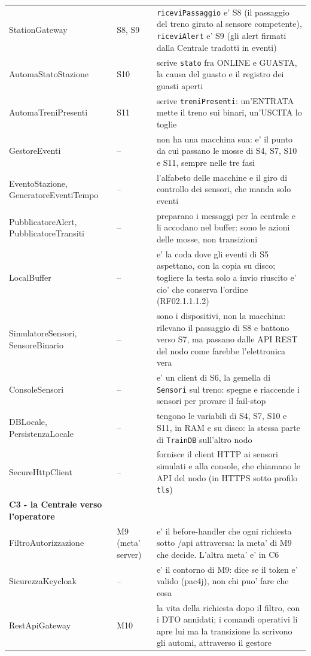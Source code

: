 \documentclass[11pt]{article}
\begin{document}
{\begin{longtable}{L{0.30\textwidth}L{0.13\textwidth}L{0.44\textwidth}}
StationGateway & S8, S9 & \texttt{riceviPassaggio} e' S8 (il passaggio del treno girato al sensore competente), \texttt{riceviAlert} e' S9 (gli alert firmati dalla Centrale tradotti in eventi)\\
AutomaStatoStazione & S10 & scrive \texttt{stato} fra ONLINE e GUASTA, la causa del guasto e il registro dei guasti aperti\\
AutomaTreniPresenti & S11 & scrive \texttt{treniPresenti}: un'ENTRATA mette il treno sui binari, un'USCITA lo toglie\\
GestoreEventi & -- & non ha una macchina sua: e' il punto da cui passano le mosse di S4, S7, S10 e S11, sempre nelle tre fasi\\
EventoStazione, GeneratoreEventiTempo & -- & l'alfabeto delle macchine e il giro di controllo dei sensori, che manda solo eventi\\
PubblicatoreAlert, PubblicatoreTransiti & -- & preparano i messaggi per la centrale e li accodano nel buffer: sono le azioni delle mosse, non transizioni\\
LocalBuffer & -- & e' la coda dove gli eventi di S5 aspettano, con la copia su disco; togliere la testa solo a invio riuscito e' cio' che conserva l'ordine (RF02.1.1.1.2)\\
SimulatoreSensori, SensoreBinario & -- & sono i dispositivi, non la macchina: rilevano il passaggio di S8 e battono verso S7, ma passano dalle API REST del nodo come farebbe l'elettronica vera\\
ConsoleSensori & -- & e' un client di S6, la gemella di \texttt{Sensori} sul treno: spegne e riaccende i sensori per provare il fail-stop\\
DBLocale, PersistenzaLocale & -- & tengono le variabili di S4, S7, S10 e S11, in RAM e su disco: la stessa parte di \texttt{TrainDB} sull'altro nodo\\
SecureHttpClient & -- & fornisce il client HTTP ai sensori simulati e alla console, che chiamano le API del nodo (in HTTPS sotto profilo \texttt{tls})\\
\hline
\textbf{C3 - la Centrale verso l'operatore} &  & \\
FiltroAutorizzazione & M9 (meta' server) & e' il before-handler che ogni richiesta sotto /api attraversa: la meta' di M9 che decide. L'altra meta' e' in C6\\
SicurezzaKeycloak & -- & e' il contorno di M9: dice se il token e' valido (pac4j), non chi puo' fare che cosa\\
RestApiGateway & M10 & la vita della richiesta dopo il filtro, con i DTO annidati; i comandi operativi li apre lui ma la transizione la scrivono gli automi, attraverso il gestore\\

\end{longtable}}
\end{document}
